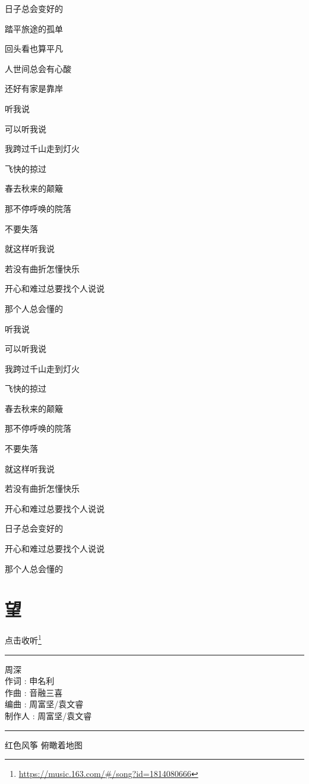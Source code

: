 \documentclass[]{ctexbook}
\renewcommand{\href}[2]{#2\footnote{\url{#1}}}
\begin{document}
日子总会变好的

踏平旅途的孤单

回头看也算平凡

人世间总会有心酸

还好有家是靠岸

听我说

可以听我说

我跨过千山走到灯火

飞快的掠过

春去秋来的颠簸

那不停呼唤的院落

不要失落

就这样听我说

若没有曲折怎懂快乐

开心和难过总要找个人说说

那个人总会懂的

听我说

可以听我说

我跨过千山走到灯火

飞快的掠过

春去秋来的颠簸

那不停呼唤的院落

不要失落

就这样听我说

若没有曲折怎懂快乐

开心和难过总要找个人说说

日子总会变好的

开心和难过总要找个人说说

那个人总会懂的

\section*{望}\label{hope}


\href{https://music.163.com/\#/song?id=1814080666}{点击收听}

\begin{center}\rule{0.5\linewidth}{0.5pt}\end{center}

周深\\
作词 : 申名利\\
作曲 : 音融三喜\\
编曲 : 周富坚/袁文睿\\
制作人 : 周富坚/袁文睿

\begin{center}\rule{0.5\linewidth}{0.5pt}\end{center}

红色风筝 俯瞰着地图
\end{document}
